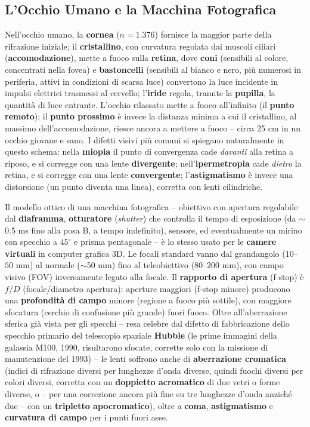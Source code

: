 \documentclass[a4paper,11pt]{article}
\begin{document}
\subsection{L'Occhio Umano e la Macchina Fotografica}

Nell'occhio umano, la \textbf{cornea} ($n=1.376$) fornisce la maggior parte della rifrazione iniziale; il \textbf{cristallino}, con curvatura regolata dai muscoli ciliari (\textbf{accomodazione}), mette a fuoco sulla \textbf{retina}, dove \textbf{coni} (sensibili al colore, concentrati nella fovea) e \textbf{bastoncelli} (sensibili al bianco e nero, più numerosi in periferia, attivi in condizioni di scarsa luce) convertono la luce incidente in impulsi elettrici trasmessi al cervello; l'\textbf{iride} regola, tramite la \textbf{pupilla}, la quantità di luce entrante. L'occhio rilassato mette a fuoco all'infinito (il \textbf{punto remoto}); il \textbf{punto prossimo} è invece la distanza minima a cui il cristallino, al massimo dell'accomodazione, riesce ancora a mettere a fuoco -- circa 25 cm in un occhio giovane e sano. I difetti visivi più comuni si spiegano naturalmente in questo schema: nella \textbf{miopia} il punto di convergenza cade \emph{davanti} alla retina a riposo, e si corregge con una lente \textbf{divergente}; nell'\textbf{ipermetropia} cade \emph{dietro} la retina, e si corregge con una lente \textbf{convergente}; l'\textbf{astigmatismo} è invece una distorsione (un punto diventa una linea), corretta con lenti cilindriche.

Il modello ottico di una macchina fotografica -- obiettivo con apertura regolabile dal \textbf{diaframma}, \textbf{otturatore} (\emph{shutter}) che controlla il tempo di esposizione (da $\sim$0.5 ms fino alla posa B, a tempo indefinito), sensore, ed eventualmente un mirino con specchio a $45^{\circ}$ e prisma pentagonale -- è lo stesso usato per le \textbf{camere virtuali} in computer grafica 3D. Le focali standard vanno dal grandangolo ($10$--$50$ mm) al normale ($\sim$50 mm) fino al teleobiettivo ($80$--$200$ mm), con campo visivo (FOV) inversamente legato alla focale. Il \textbf{rapporto di apertura} (f-stop) è $f/D$ (focale/diametro apertura): aperture maggiori (f-stop minore) producono una \textbf{profondità di campo} minore (regione a fuoco più sottile), con maggiore sfocatura (cerchio di confusione più grande) fuori fuoco. Oltre all'aberrazione sferica già vista per gli specchi -- resa celebre dal difetto di fabbricazione dello specchio primario del telescopio spaziale \textbf{Hubble} (le prime immagini della galassia M100, 1990, risultarono sfocate, corrette solo con la missione di manutenzione del 1993) -- le lenti soffrono anche di \textbf{aberrazione cromatica} (indici di rifrazione diversi per lunghezze d'onda diverse, quindi fuochi diversi per colori diversi, corretta con un \textbf{doppietto acromatico} di due vetri o forme diverse, o -- per una correzione ancora più fine su tre lunghezze d'onda anziché due -- con un \textbf{tripletto apocromatico}), oltre a \textbf{coma}, \textbf{astigmatismo} e \textbf{curvatura di campo} per i punti fuori asse.
\end{document}
